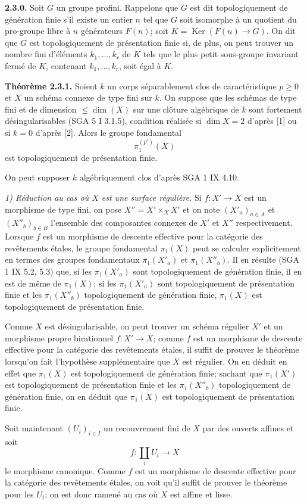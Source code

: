 \documentclass[11pt]{article}
\providecommand{\Ker}{\operatorname{Ker}}
\begin{document}
\textbf{2.3.0.} Soit $G$ un groupe profini. Rappelons que $G$ est dit topologiquement de génération finie s'il existe un entier $n$ tel que $G$ soit isomorphe à un quotient du pro-groupe libre à $n$ générateurs $F(n)$; soit $K=\Ker(F(n)\to G)$. On dit que $G$ est topologiquement de présentation finie si, de plus, on peut trouver un nombre fini d'éléments $k_1,\ldots,k_r$ de $K$ tels que le plus petit sous-groupe invariant fermé de $K$, contenant $k_1,\ldots,k_r$, soit égal à $K$.

\textbf{Théorème 2.3.1.} Soient $k$ un corps séparablement clos de caractéristique $p\ge0$ et $X$ un schéma connexe de type fini sur $k$. On suppose que les schémas de type fini et de dimension $\le \dim(X)$ sur une clôture algébrique de $k$ sont fortement désingularisables (SGA 5 I 3.1.5), condition réalisée si $\dim X=2$ d'après [1] ou si $k=0$ d'après [2]. Alors le groupe fondamental
\[
 \pi_1^{(p')}(X)
\]
est topologiquement de présentation finie.

On peut supposer $k$ algébriquement clos d'après SGA 1 IX 4.10.

\emph{1) Réduction au cas où $X$ est une surface régulière.} Si $f:X'\to X$ est un morphisme de type fini, on pose $X''=X'\times_X X'$ et on note $(X'_a)_{a\in A}$ et $(X''_b)_{b\in B}$ l'ensemble des composantes connexes de $X'$ et $X''$ respectivement. Lorsque $f$ est un morphisme de descente effective pour la catégorie des revêtements étales, le groupe fondamental $\pi_1(X)$ peut se calculer explicitement en termes des groupes fondamentaux $\pi_1(X'_a)$ et $\pi_1(X''_b)$. Il en résulte (SGA 1 IX 5.2, 5.3) que, si les $\pi_1(X'_a)$ sont topologiquement de génération finie, il en est de même de $\pi_1(X)$; si les $\pi_1(X'_a)$ sont topologiquement de présentation finie et les $\pi_1(X''_b)$ topologiquement de génération finie, $\pi_1(X)$ est topologiquement de présentation finie.

Comme $X$ est désingularisable, on peut trouver un schéma régulier $X'$ et un morphisme propre birationnel $f:X'\to X$; comme $f$ est un morphisme de descente effective pour la catégorie des revêtements étales, il suffit de prouver le théorème lorsqu'on fait l'hypothèse supplémentaire que $X$ est régulier. On en déduit en effet que $\pi_1(X)$ est topologiquement de génération finie; sachant que $\pi_1(X')$ est topologiquement de présentation finie et les $\pi_1(X''_b)$ topologiquement de génération finie, on en déduit que $\pi_1(X)$ est topologiquement de présentation finie.

Soit maintenant $(U_i)_{i\in I}$ un recouvrement fini de $X$ par des ouverts affines et soit
\[
 f:\coprod_i U_i\longrightarrow X
\]
le morphisme canonique. Comme $f$ est un morphisme de descente effective pour la catégorie des revêtements étales, on voit qu'il suffit de prouver le théorème pour les $U_i$; on est donc ramené au cas où $X$ est affine et lisse.
\end{document}
